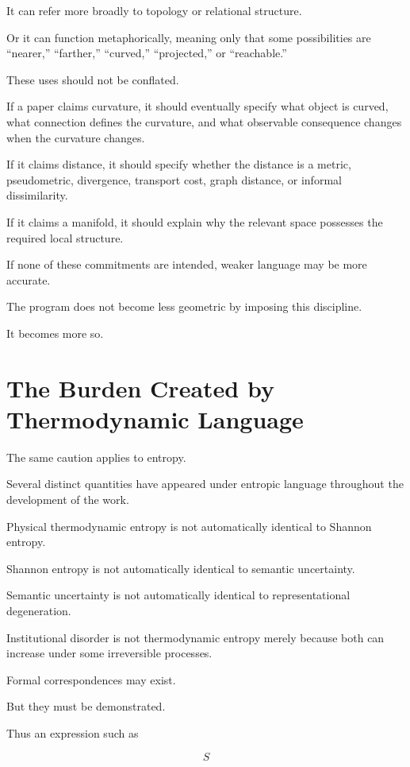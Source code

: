 \documentclass[11pt]{article}
\theoremstyle{remark}
\begin{document}
It can refer more broadly to topology or relational structure.

Or it can function metaphorically, meaning only that some possibilities are
``nearer,'' ``farther,'' ``curved,'' ``projected,'' or ``reachable.''

These uses should not be conflated.

If a paper claims curvature, it should eventually specify what object is curved,
what connection defines the curvature, and what observable consequence changes
when the curvature changes.

If it claims distance, it should specify whether the distance is a metric,
pseudometric, divergence, transport cost, graph distance, or informal
dissimilarity.

If it claims a manifold, it should explain why the relevant space possesses the
required local structure.

If none of these commitments are intended, weaker language may be more accurate.

The program does not become less geometric by imposing this discipline.

It becomes more so.

\section{The Burden Created by Thermodynamic Language}

The same caution applies to entropy.

Several distinct quantities have appeared under entropic language throughout
the development of the work.

Physical thermodynamic entropy is not automatically identical to Shannon
entropy.

Shannon entropy is not automatically identical to semantic uncertainty.

Semantic uncertainty is not automatically identical to representational
degeneration.

Institutional disorder is not thermodynamic entropy merely because both can
increase under some irreversible processes.

Formal correspondences may exist.

But they must be demonstrated.

Thus an expression such as

\begin{equation}
S
\end{equation}
\end{document}
